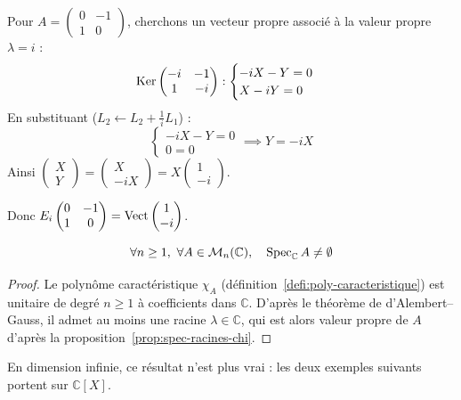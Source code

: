\begin{exemple}
Pour $A=\begin{pmatrix} 0 & -1 \\ 1 & 0\end{pmatrix}$, cherchons un vecteur propre associé à la valeur propre $\lambda=i$ :
\[\operatorname{Ker}\begin{pmatrix} -i & -1 \\ 1 & -i\end{pmatrix} : \begin{cases} -iX-Y=0 \\ X-iY=0\end{cases}\]
En substituant ($L_2 \leftarrow L_2 + \frac{1}{i}L_1$) :
\[\begin{cases} -iX-Y=0 \\ 0=0\end{cases} \implies Y=-iX\]
Ainsi $\begin{pmatrix} X \\ Y\end{pmatrix} = \begin{pmatrix} X \\ -iX\end{pmatrix} = X\begin{pmatrix} 1 \\ -i\end{pmatrix}$.

Donc $E_i\begin{pmatrix} 0 & -1 \\ 1 & 0\end{pmatrix} = \operatorname{Vect}\begin{pmatrix} 1 \\ -i\end{pmatrix}$.
\end{exemple}

\begin{prop}
\label{prop:spec-C-non-vide}
\[\forall n\geq 1,\ \forall A\in\mathcal{M}_n(\mathbb{C}), \quad \operatorname{Spec}_{\mathbb{C}} A \neq \emptyset\]
\end{prop}

\begin{proof}
Le polynôme caractéristique $\chi_A$ (définition~\ref{defi:poly-caracteristique}) est unitaire de degré $n\geq 1$ à coefficients dans $\mathbb{C}$. D'après le théorème de d'Alembert--Gauss, il admet au moins une racine $\lambda\in\mathbb{C}$, qui est alors valeur propre de $A$ d'après la proposition~\ref{prop:spec-racines-chi}.
\end{proof}

En dimension infinie, ce résultat n'est plus vrai : les deux exemples suivants portent sur $\mathbb{C}[X]$.

